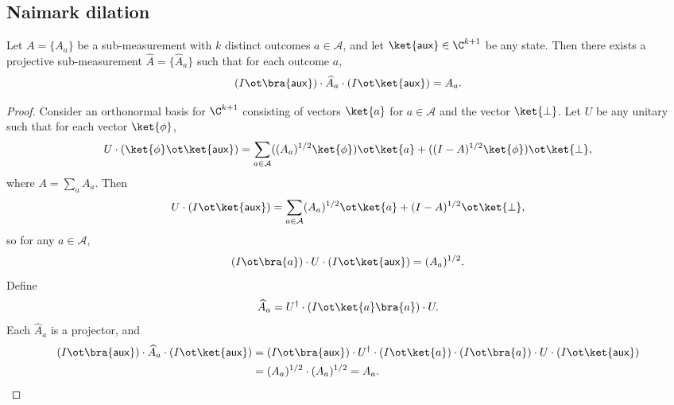 \subsection{Naimark dilation}\label{sec:naimark}

\begin{lemma}\label{lem:naimark-helper}
	\leanok
	Let $A = \{A_a\}$ be a sub-measurement with $k$ distinct outcomes $a \in \mathcal A$, and let $\ket{\mathsf{aux}} \in \C^{k+1}$ be any state. Then there exists a projective sub-measurement $\widehat{A} = \{\widehat{A}_a\}$ such that for each outcome $a$,
	\[
		(I \ot \bra{\mathsf{aux}}) \cdot \widehat{A}_a \cdot (I \ot \ket{\mathsf{aux}})
		=
		A_a.
	\]
\end{lemma}
\begin{proof}
	\leanok
	Consider an orthonormal basis for $\C^{k+1}$ consisting of vectors $\ket{a}$ for $a \in \mathcal A$ and the vector $\ket{\bot}$. Let $U$ be any unitary such that for each vector $\ket{\phi}$,
	\[
		U \cdot (\ket{\phi} \ot \ket{\mathsf{aux}})
		=
		\sum_{a \in \mathcal A} ((A_a)^{1/2}\ket{\phi}) \ot \ket{a}
		+
		((I-A)^{1/2}\ket{\phi}) \ot \ket{\bot},
	\]
	where $A=\sum_a A_a$. Then
	\[
		U \cdot (I \ot \ket{\mathsf{aux}})
		=
		\sum_{a \in \mathcal A} (A_a)^{1/2} \ot \ket{a}
		+
		(I-A)^{1/2} \ot \ket{\bot},
	\]
	so for any $a \in \mathcal A$,
	\[
		(I \ot \bra{a}) \cdot U \cdot (I \ot \ket{\mathsf{aux}})
		=
		(A_a)^{1/2}.
	\]
	Define
	\[
		\widehat{A}_a = U^\dagger \cdot (I \ot \ket{a}\bra{a}) \cdot U.
	\]
	Each $\widehat{A}_a$ is a projector, and
	\begin{align*}
		(I \ot \bra{\mathsf{aux}}) \cdot \widehat{A}_a \cdot (I \ot \ket{\mathsf{aux}})
		 & =
		(I \ot \bra{\mathsf{aux}}) \cdot U^\dagger \cdot (I \ot \ket{a}) \cdot (I \ot \bra{a}) \cdot U \cdot (I \ot \ket{\mathsf{aux}}) \\
		 & =
		(A_a)^{1/2} \cdot (A_a)^{1/2}
		=
		A_a.
	\end{align*}
\end{proof}

